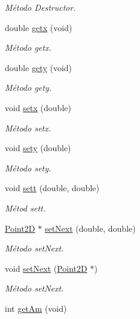 \begin{DoxyCompactItemize}
\begin{DoxyCompactList}\small\item\em Método Destructor. \end{DoxyCompactList}\item 
double \hyperlink{class_point2_d_abe2430aa7078f09496b538da52ef35cb}{getx} (void)
\begin{DoxyCompactList}\small\item\em Método getx. \end{DoxyCompactList}\item 
double \hyperlink{class_point2_d_ab01bf498063e4a6d29fbcff95b06e092}{gety} (void)
\begin{DoxyCompactList}\small\item\em Método gety. \end{DoxyCompactList}\item 
void \hyperlink{class_point2_d_a36d1b973b13ebf9c634d369119ca8c2e}{setx} (double)
\begin{DoxyCompactList}\small\item\em Método setx. \end{DoxyCompactList}\item 
void \hyperlink{class_point2_d_ae60a82352ce1f39527a97fcd941fa9bc}{sety} (double)
\begin{DoxyCompactList}\small\item\em Método sety. \end{DoxyCompactList}\item 
void \hyperlink{class_point2_d_a0f372c747ea163de8e73029d58de1b74}{sett} (double, double)
\begin{DoxyCompactList}\small\item\em Métod sett. \end{DoxyCompactList}\item 
\hyperlink{class_point2_d}{Point2\-D} $\ast$ \hyperlink{class_point2_d_af1c0abe6d1613d7f3929524ab4de071c}{set\-Next} (double, double)
\begin{DoxyCompactList}\small\item\em Método set\-Next. \end{DoxyCompactList}\item 
void \hyperlink{class_point2_d_ab194d1868b4931ea7e2615151477df87}{set\-Next} (\hyperlink{class_point2_d}{Point2\-D} $\ast$)
\begin{DoxyCompactList}\small\item\em Método set\-Next. \end{DoxyCompactList}\item 
int \hyperlink{class_point2_d_ad58676dabebce9c9f48dd143c098e14a}{get\-Am} (void)

\end{DoxyCompactItemize}
